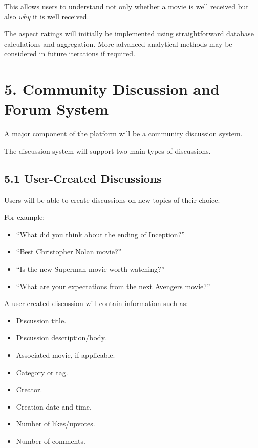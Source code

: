 \documentclass[11pt,a4paper]{article}
\begin{document}
This allows users to understand not only whether a movie is well received but also \textit{why} it is well received.

The aspect ratings will initially be implemented using straightforward database calculations and aggregation. More advanced analytical methods may be considered in future iterations if required.



\section{5. Community Discussion and Forum System}

A major component of the platform will be a community discussion system.

The discussion system will support two main types of discussions.

\subsection{5.1 User-Created Discussions}

Users will be able to create discussions on new topics of their choice.

For example:

\begin{itemize}

    \item ``What did you think about the ending of Inception?''

    \item ``Best Christopher Nolan movie?''

    \item ``Is the new Superman movie worth watching?''

    \item ``What are your expectations from the next Avengers movie?''

\end{itemize}

A user-created discussion will contain information such as:

\begin{itemize}

    \item Discussion title.

    \item Discussion description/body.

    \item Associated movie, if applicable.

    \item Category or tag.

    \item Creator.

    \item Creation date and time.

    \item Number of likes/upvotes.

    \item Number of comments.

\end{itemize}
\end{document}
